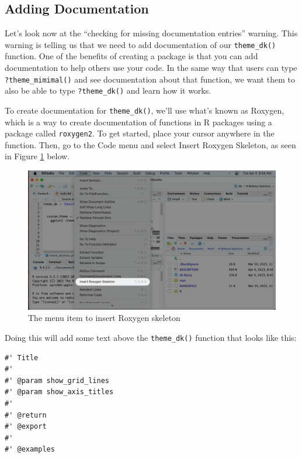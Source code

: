 \documentclass[
]{book}
\begin{document}
\hypertarget{adding-documentation}{%
\subsection*{Adding Documentation}\label{adding-documentation}}

Let's look now at the ``checking for missing documentation entries'' warning. This warning is telling us that we need to add documentation of our \texttt{theme\_dk()} function. One of the benefits of creating a package is that you can add documentation to help others use your code. In the same way that users can type \texttt{?theme\_mimimal()} and see documentation about that function, we want them to also be able to type \texttt{?theme\_dk()} and learn how it works.

To create documentation for \texttt{theme\_dk()}, we'll use what's known as Roxygen, which is a way to create documentation of functions in R packages using a package called \texttt{roxygen2}. To get started, place your cursor anywhere in the function. Then, go to the Code menu and select Insert Roxygen Skeleton, as seen in Figure \ref{fig:insert-roxygen-skeleton} below.

\begin{figure}
\includegraphics[width=1\linewidth]{assets/insert-roxygen-skeleton} \caption{The menu item to insert Roxygen skeleton}\label{fig:insert-roxygen-skeleton}
\end{figure}

Doing this will add some text above the \texttt{theme\_dk()} function that looks like this:

\begin{verbatim}
#' Title
#'
#' @param show_grid_lines 
#' @param show_axis_titles 
#'
#' @return
#' @export
#'
#' @examples
\end{verbatim}
\end{document}
